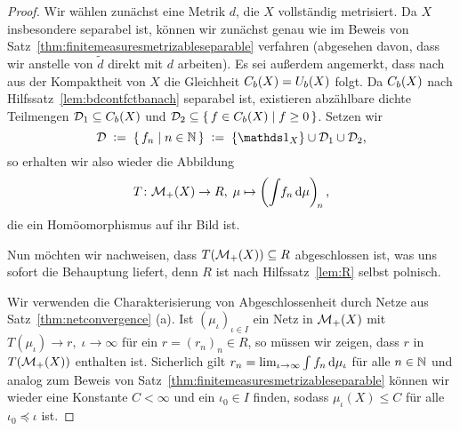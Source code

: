 \documentclass[../main/main.tex]{subfiles}
\begin{document}
	\begin{proof}
		Wir wählen zunächst eine Metrik $d$, die $X$ vollständig metrisiert. Da $X$ insbesondere separabel ist, können wir zunächst genau wie 
		im Beweis von Satz~\ref{thm:finitemeasuresmetrizableseparable} verfahren
		(abgesehen davon, dass wir anstelle von $\tilde{d}$ direkt mit $d$ arbeiten). Es sei außerdem angemerkt, dass nach \cite[Satz 2.3.10]{Simon.2015} aus der Kompaktheit von $X$ die Gleichheit $C_b(X) = U_b(X)$ folgt. Da $C_b(X)$ nach Hilfssatz~\ref{lem:bdcontfctbanach} separabel ist, existieren abzählbare dichte Teilmengen $\mathcal{D}_1 \subseteq C_b(X)$ und $\mathcal{D}_2 \subseteq \left\{\, f \in C_b(X) \; \middle| \; f \geq 0 \,\right\}$. Setzen wir 
		\[ \mathcal{D} \; \defby \; \setcomp{f_n}{n \in \N} \; \defby \; \set{\indfct_X} \cup \mathcal{D}_1 \cup \mathcal{D}_2 \text{,} \] 
		so erhalten wir also wieder die Abbildung
		\[ T \colon \mathcal{M}_{+}(X) \to R, \; \mu \mapsto \left( \int_{} \, f_n \, \mathrm{d}\mu \right)_{\! n}  \text{,} \]
		die ein Homöomorphismus auf ihr Bild ist. 
		
		Nun möchten wir nachweisen, dass $T(\mathcal{M}_{+}(X)) \subseteq R$ abgeschlossen ist, was uns sofort die Behauptung liefert, denn $R$ ist nach Hilfssatz~\ref{lem:R} selbst polnisch.
		
		Wir verwenden die Charakterisierung von Abgeschlossenheit 
		durch Netze aus Satz~\ref{thm:netconvergence} (a). Ist $(\mu_\iota)_{\iota \in I}$ ein Netz in $\mathcal{M}_{+}(X)$ mit $T(\mu_\iota) \to r, \; \iota \to \infty$
		für ein $r = (r_n)_n \in R$, so müssen wir zeigen, dass $r$ in $T(\mathcal{M}_{+}(X))$ enthalten ist. Sicherlich gilt
		$r_n = \lim_{\iota \to \infty} \int_{} \, f_n \, \mathrm{d}\mu_\iota$ für alle $n \in \mathbb{N}$ und analog zum Beweis von Satz~\ref{thm:finitemeasuresmetrizableseparable} 
		können wir wieder eine Konstante $C < \infty$ und ein $\iota_0 \in I$ finden, sodass $\mu_\iota(X) \leq C$ für alle $\iota_0 \preceq \iota$ ist.
		

\end{proof}
\end{document}

